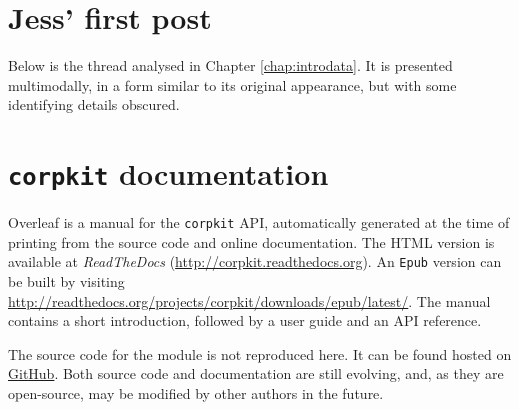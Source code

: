 \documentclass[a4paper,10pt,abstract=on]{scrreprt}
\begin{document}
\begin{appendices}
\chapter{Jess' first post} \label{appendix:thread}

Below is the \gls{thread} analysed in Chapter \ref{chap:introdata}. It is presented multimodally, in a form similar to its original appearance, but with some identifying details obscured.



\clearpage

\chapter{\texttt{corpkit} documentation} \label{appendix:corpkit}

Overleaf is a manual for the \texttt{corpkit} \gls{API}, automatically generated at the time of printing from the source code and online documentation. The \gls{HTML} version is available at \emph{ReadTheDocs} (\url{http://corpkit.readthedocs.org}). An \texttt{Epub} version can be built by visiting \url{http://readthedocs.org/projects/corpkit/downloads/epub/latest/}. The manual contains a short introduction, followed by a user guide and an \gls{API} reference.

The source code for the module is not reproduced here. It can be found hosted on \href{https://github.com/interrogator/corpkit}{GitHub}. Both source code and documentation are still evolving, and, as they are open-source, may be modified by other authors in the future.


\end{appendices}
\end{document}

